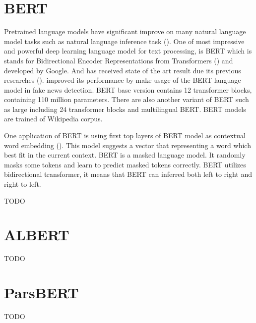 
\section{BERT}
Pretrained language models have significant improve on many natural language model tasks such as natural language inference task (\cite{bert}). One of most impressive and powerful deep learning language model for text processing, is BERT which is stands for Bidirectional Encoder
Representations from Transformers (\cite{bert}) and developed by Google. And has received state of the art result due its previous researches (\cite{bert}). \cite{spotfake} improved its performance by make usage of the BERT language model in fake news detection. BERT base version contains 12 transformer blocks, containing 110 million parameters. There are also another variant of BERT such as large including 24 transformer blocks and multilingual BERT. BERT models are trained of Wikipedia corpus. 

One application of BERT is using first top layers of BERT model as contextual word embedding (\cite{book_datafake}). This model suggests a vector that representing a word which best fit in the current context.  BERT is a masked language model. It randomly masks some tokens and learn to predict masked tokens correctly. BERT utilizes bidirectional transformer, it means that BERT can inferred both left to right and right to left.

   
{\color{green}TODO}

\section{ALBERT}
{\color{green}TODO}

\section{ParsBERT}
{\color{green}TODO}